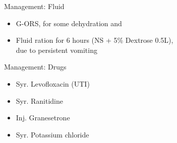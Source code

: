 \documentclass[10pt]{beamer}
\begin{document}

{
\begin{frame}{Management: Fluid}
	\begin{itemize}
		\item G-ORS, for some dehydration and
		\item Fluid ration for 6 hours (NS + 5\% Dextrose 0.5L), \\
		due to persistent vomiting
	\end{itemize}
\end{frame}
}

{
\begin{frame}{Management: Drugs}
	\begin{itemize}
		\item Syr. Levofloxacin (UTI)
		\item Syr. Ranitidine
		\item Inj. Granesetrone
		\item Syr. Potassium chloride
	\end{itemize}
\end{frame}
}

\end{document}
